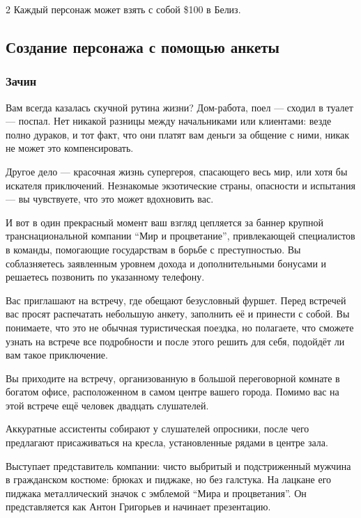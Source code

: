 \documentclass[twoside]{article}
\begin{document}
\begin{multicols}{2}
Каждый персонаж может взять с собой \$100 в Белиз.

\subsection{Создание персонажа с помощью анкеты}\label{questionnaire-character}

\subsubsection{Зачин}\label{prologue}

Вам всегда казалась скучной рутина жизни? Дом-работа, поел --- сходил в
туалет --- поспал. Нет никакой разницы между начальниками или клиентами:
везде полно дураков, и тот факт, что они платят вам деньги за общение с
ними, никак не может это компенсировать.

Другое дело --- красочная жизнь супергероя, спасающего весь мир, или хотя
бы искателя приключений. Незнакомые экзотические страны, опасности и
испытания --- вы чувствуете, что это может вдохновить вас.

И вот в один прекрасный момент ваш взгляд цепляется за баннер крупной
транснациональной компании \enquote{Мир и процветание}, привлекающей
специалистов в команды, помогающие государствам в борьбе с
преступностью. Вы соблазняетесь заявленным уровнем дохода и
дополнительными бонусами и решаетесь позвонить по указанному телефону.

Вас приглашают на встречу, где обещают безусловный фуршет. Перед
встречей вас просят распечатать небольшую анкету, заполнить её и
принести с собой. Вы понимаете, что это не обычная туристическая
поездка, но полагаете, что сможете узнать на встрече все подробности и
после этого решить для себя, подойдёт ли вам такое приключение.

Вы приходите на встречу, организованную в большой переговорной комнате в
богатом офисе, расположенном в самом центре вашего города. Помимо вас на
этой встрече ещё человек двадцать слушателей.

Аккуратные ассистенты собирают у слушателей опросники, после чего
предлагают присаживаться на кресла, установленные рядами в центре зала.

Выступает представитель компании: чисто выбритый и подстриженный мужчина
в гражданском костюме: брюках и пиджаке, но без галстука. На лацкане его
пиджака металлический значок с эмблемой \enquote{Мира и процветания}. Он
представляется как Антон Григорьев и начинает презентацию.


\end{multicols}
\end{document}
